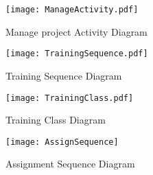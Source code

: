 \documentclass{article}
\begin{document}
\begin{figure}[h]
\caption{Manage project Activity Diagram}
\centering
\texttt{[image: ManageActivity.pdf]}
\centering
\end{figure}

\begin{figure}[h]
\caption{Training Sequence Diagram}
\centering
\texttt{[image: TrainingSequence.pdf]}
\centering
\end{figure}

\begin{figure}[h]
\caption{Training Class Diagram}
\centering
\texttt{[image: TrainingClass.pdf]}
\centering
\end{figure}

\begin{figure}[h]
\caption{Assignment Sequence Diagram}
\centering
\texttt{[image: AssignSequence]}
\centering
\end{figure}
\end{document}
